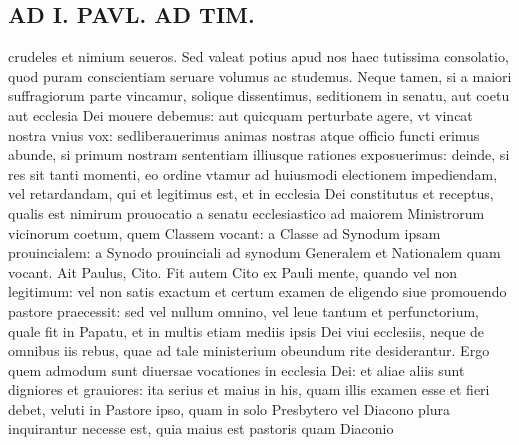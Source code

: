 \documentclass{article}
\begin{document}
\begin{pages}
\section*{AD I. PAVL. AD TIM. }
\marginpar{[ p.340 ]}\pstart crudeles et nimium seueros. Sed valeat potius apud nos haec tutissima consolatio, quod puram conscientiam seruare volumus ac studemus. Neque tamen, si a maiori suffragiorum parte vincamur, solique dissentimus, seditionem in senatu, aut coetu aut ecclesia Dei mouere debemus: aut quicquam perturbate agere, vt vincat nostra vnius vox: sedliberauerimus animas nostras atque officio functi erimus abunde, si primum nostram sententiam illiusque rationes exposuerimus: deinde, si res sit tanti momenti, eo ordine vtamur ad huiusmodi electionem impediendam, vel retardandam, qui et legitimus est, et in ecclesia Dei constitutus et receptus, qualis est nimirum prouocatio a senatu ecclesiastico ad maiorem Ministrorum vicinorum coetum, quem Classem vocant: a Classe ad Synodum ipsam prouincialem: a Synodo prouinciali ad synodum Generalem et Nationalem quam vocant. Ait Paulus, Cito. Fit autem Cito ex Pauli mente, quando vel non legitimum: vel non satis exactum et certum examen de eligendo siue promouendo pastore praecessit: sed vel nullum omnino, vel leue tantum et perfunctorium, quale fit in Papatu, et in multis etiam mediis ipsis Dei viui ecclesiis, neque de omnibus iis rebus, quae ad tale ministerium obeundum rite desiderantur. Ergo quem admodum sunt diuersae vocationes in ecclesia Dei: et aliae aliis sunt digniores et grauiores: ita serius et maius in his, quam illis examen esse et fieri debet, veluti in Pastore ipso, quam in solo Presbytero vel Diacono plura inquirantur necesse est, quia maius est pastoris quam Diaconio\pend

\end{pages}
\end{document}
